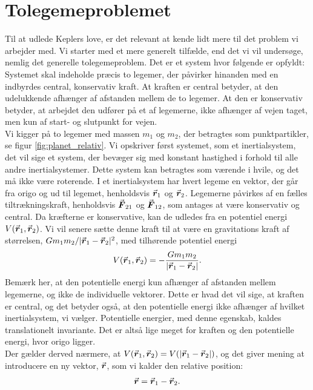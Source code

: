 \section{Tolegemeproblemet}
Til at udlede Keplers love, er det relevant at kende lidt mere til det problem vi arbejder med. Vi starter med et mere generelt tilfælde, end det vi vil undersøge, nemlig det generelle tolegemeproblem. Det er et system hvor følgende er opfyldt: Systemet skal indeholde præcis to legemer, der påvirker hinanden med en indbyrdes central, konservativ kraft. At kraften er central betyder, at den udelukkende afhænger af afstanden mellem de to legemer. At den er konservativ betyder, at arbejdet den udfører på et af legemerne, ikke afhænger af vejen taget, men kun af start- og slutpunkt for vejen.\\
Vi kigger på to legemer med massen $m_1$ og $m_2$, der betragtes som punktpartikler, se figur \ref{fig:planet_relativ}. Vi opskriver først systemet, som et inertialsystem, det vil sige et system, der bevæger sig med konstant hastighed i forhold til alle andre inertialsystemer. Dette system kan betragtes som værende i hvile, og det må ikke være roterende. I et inertialsystem har hvert legeme en vektor, der går fra origo og ud til legemet, henholdsvis ${\vec{\boldsymbol{r}}}_{\text{1}}$ og ${\vec{\boldsymbol{r}}}_{\text{2}}$. Legemerne påvirkes af en fælles tiltrækningskraft, henholdsvis ${\vec{\boldsymbol{F}}}_{\text{21}}$ og ${\vec{\boldsymbol{F}}}_{\text{12}}$, som antages at være konservativ og central. Da kræfterne er konservative, kan de udledes fra en potentiel energi $V({\vec{\boldsymbol{r}}}_{\text{1}},{\vec{\boldsymbol{r}}}_{\text{2}})$. Vi vil senere sætte denne kraft til at være en gravitations kraft af størrelsen, $Gm_1m_2/|{\vec{\boldsymbol{r}}}_{\text{1}}-{\vec{\boldsymbol{r}}}_{\text{2}}|^2$, med tilhørende potentiel energi
\begin{align}
	V({\vec{\boldsymbol{r}}}_{\text{1}},{\vec{\boldsymbol{r}}}_{\text{2}}) = -\frac{Gm_1m_2}{|{\vec{\boldsymbol{r}}}_{\text{1}}-{\vec{\boldsymbol{r}}}_{\text{2}}|}.
\end{align}
Bemærk her, at den potentielle energi kun afhænger af afstanden mellem legemerne, og ikke de individuelle vektorer. Dette er hvad det vil sige, at kraften er central, og det betyder også, at den potentielle energi ikke afhænger af hvilket inertialsystem, vi vælger. Potentielle energier, med denne egenskab, kaldes translationelt invariante. Det er altså lige meget for kraften og den potentielle energi, hvor origo ligger. \\
%
Der gælder derved nærmere, at $V({\vec{\boldsymbol{r}}}_{\text{1}},{\vec{\boldsymbol{r}}}_{\text{2}}) = V(|{\vec{\boldsymbol{r}}}_{\text{1}}-{\vec{\boldsymbol{r}}}_{\text{2}}|)$, og det giver mening at introducere en ny vektor, ${\vec{\boldsymbol{r}}}$, som vi kalder den relative position:
\begin{align}
	{\vec{\boldsymbol{r}}} = {\vec{\boldsymbol{r}}}_{\text{1}}-{\vec{\boldsymbol{r}}}_{\text{2}}.
\end{align}
